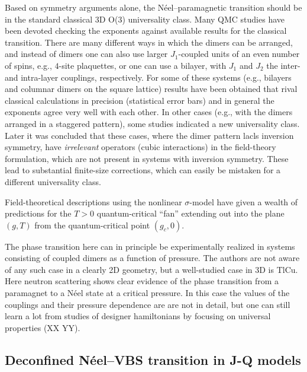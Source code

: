 \documentclass[range]{ar2e}
\begin{document}
Based on symmetry arguments alone, the N\'eel--paramagnetic transition should be in the standard classical 3D O($3$) universality class. Many QMC studies 
have been devoted checking the exponents against available results for the classical transition. There are many different ways in which the dimers can be 
arranged, and instead of dimers one can also use larger $J_1$-coupled units of an even number of spins, e.g., $4$-site plaquettes, or one can use a
bilayer, with $J_1$ and $J_2$ the inter-and intra-layer couplings, respectively. For some of these systems (e.g., bilayers and columnar dimers on the
square lattice) results have been obtained that rival classical calculations in precision (statistical error bars) and in general the exponents agree 
very well with each other. In other cases (e.g., with the dimers arranged in a staggered pattern), some studies indicated a new universality class.
Later it was concluded that these cases, where the dimer pattern lacls inversion symmetry, have {\it irrelevant} operators (cubic interactions) in 
the field-theory formulation, which are not present in systems with inversion symmetry. These lead to substantial finite-size corrections, which can
easily be mistaken for a different universality class.

Field-theoretical descriptions using the nonlinear $\sigma$-model have given a wealth of predictions for the $T>0$ quantum-critical ``fan'' extending 
out into the plane $(g,T)$  from the quantum-critical point $(g_c,0)$. 

The phase transition here can in principle be experimentally realized in systems consisting of coupled dimers as a function of pressure. The authors 
are not aware of any such case in a clearly 2D geometry, but a well-studied case in 3D is TlCu. Here neutron scattering shows clear evidence of the 
phase transition from a paramagnet to a N\'eel state at a critical pressure. In this case the values of the couplings and their pressure dependence
are are not in detail, but one can still learn a lot from studies of designer hamiltonians by focusing on universal properties (XX YY).

\subsection{Deconfined N\'eel--VBS transition in J-Q models}
\end{document}
